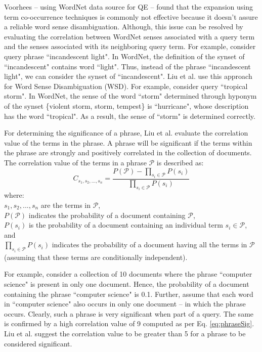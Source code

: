 Voorhees \cite{voorhees1994query} -- using WordNet data source for QE -- found that the expansion using term co-occurrence techniques is commonly not effective because it doesn't assure a reliable word sense disambiguation. Although, this issue can be resolved by evaluating the correlation between WordNet senses associated with a query term and the senses associated with its neighboring query term. For example, consider query phrase ``incandescent light". In WordNet, the definition of the synset of ``incandescent" contains word ``light". Thus, instead of the phrase ``incandescent light", we can consider the synset of ``incandescent". Liu et al. \cite{liu2004effective} use this approach for Word Sense Disambiguation (WSD). 
For example, consider query ``tropical storm". In WordNet, the sense of the word ``storm" determined through   hyponym of the synset \{violent storm, storm, tempest\} is ``hurricane", whose description has the word ``tropical". As a result, the sense of ``storm" is determined correctly. 

For determining the significance of a phrase, Liu et al. \cite{liu2004effective} evaluate the correlation value of the terms in the phrase. A phrase will be significant if the terms within the phrase are strongly and positively correlated in the collection of documents. The correlation value of the terms in a phrase $\mathcal{P}$ is described as:
\begin{equation}
\label{eq:phraseSig}
C_{s_1, s_2, ..., s_n}=\frac{P(\mathcal{P}) -\prod\limits_{s_i \in \mathcal{P}} P(s_i)}{\prod\limits_{s_i \in \mathcal{P}} P(s_i)}
\end{equation}
where:\\ $s_1, s_2,...,s_n$ are the terms in $\mathcal{P}$,\\ $P(\mathcal{P})$ indicates the probability of a document containing $\mathcal{P}$, \\$P(s_i)$ is the probability of a document containing an individual term $s_i \in \mathcal{P}$,  and \\$\prod\limits_{s_i \in \mathcal{P}} P(s_i)$ indicates the probability of a document having all the terms in $\mathcal{P}$ (assuming that these terms are conditionally independent). 


For example, consider a collection of 10 documents where the phrase ``computer science" is present in only one document. Hence, the probability of a document containing the phrase ``computer science" is 0.1. Further, assume that each word in ``computer science" also occurs in only one document -- in which the phrase occurs. Clearly, such a phrase is very significant when part of a query. The same is confirmed  by a high correlation value of 9 computed as per Eq. \ref{eq:phraseSig}. Liu et al. \cite{liu2004effective} suggest the correlation value to be greater than 5 for a phrase to be considered significant. 

